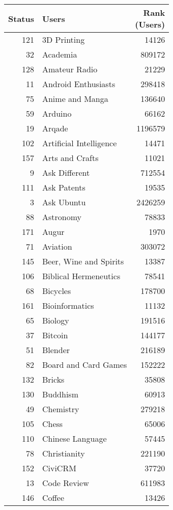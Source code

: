 \documentclass[]{book}
\theoremstyle{definition}
\theoremstyle{definition}
\theoremstyle{definition}
\theoremstyle{remark}
\begin{document}
\begin{tabular}{r|l|r}
\hline
Status & Users & \makecell[l]{Rank\\(Users)}\\
\hline
121 & 3D Printing & 14126\\
\hline
32 & Academia & 809172\\
\hline
128 & Amateur Radio & 21229\\
\hline
11 & Android Enthusiasts & 298418\\
\hline
75 & Anime and Manga & 136640\\
\hline
59 & Arduino & 66162\\
\hline
19 & Arqade & 1196579\\
\hline
102 & Artificial Intelligence & 14471\\
\hline
157 & Arts and Crafts & 11021\\
\hline
9 & Ask Different & 712554\\
\hline
111 & Ask Patents & 19535\\
\hline
3 & Ask Ubuntu & 2426259\\
\hline
88 & Astronomy & 78833\\
\hline
171 & Augur & 1970\\
\hline
71 & Aviation & 303072\\
\hline
145 & Beer, Wine and Spirits & 13387\\
\hline
106 & Biblical Hermeneutics & 78541\\
\hline
68 & Bicycles & 178700\\
\hline
161 & Bioinformatics & 11132\\
\hline
65 & Biology & 191516\\
\hline
37 & Bitcoin & 144177\\
\hline
51 & Blender & 216189\\
\hline
82 & Board and Card Games & 152222\\
\hline
132 & Bricks & 35808\\
\hline
130 & Buddhism & 60913\\
\hline
49 & Chemistry & 279218\\
\hline
105 & Chess & 65006\\
\hline
110 & Chinese Language & 57445\\
\hline
78 & Christianity & 221190\\
\hline
152 & CiviCRM & 37720\\
\hline
13 & Code Review & 611983\\
\hline
146 & Coffee & 13426\\

\end{tabular}
\end{document}
